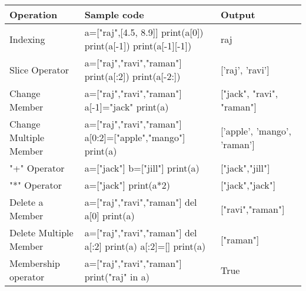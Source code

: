 
\begin{flushleft}
		
		\begin{tabulary}{1.0\textwidth}{|p{7em}|p{10em}|p{7em}|}
			\toprule
			\textbf{Operation} & \textbf{Sample code}  & \textbf{Output} \\
			\midrule
			Indexing & a=["raj",[4.5, 8.9]] \newline print(a[0]) \newline print(a[-1])  \newline print(a[-1][-1]) & raj \newline [4.5, 8.9]  \\
			\hline
			Slice Operator & a=["raj","ravi","raman"] \newline print(a[:2]) \newline print(a[-2:]) & ['raj', 'ravi']   \\
			\hline
			Change Member & a=["raj","ravi","raman"] \newline a[-1]="jack" \newline
			print(a) & ["jack", "ravi", "raman"]  \\
			\hline
			Change Multiple Member & a=["raj","ravi","raman"] \newline a[0:2]=["apple","mango"]  \newline print(a) & ['apple', 'mango', 'raman']  \\
			\hline
			"+" Operator & a=["jack"] \newline b=["jill"] \newline print(a) & ["jack","jill"] \\
			\hline
			"*" Operator & a=["jack"] \newline print(a*2) & ["jack","jack"] \\
			\hline
			Delete a Member & a=["raj","ravi","raman"] \newline del a[0] \newline print(a) & ["ravi","raman"] \\
			\hline
			Delete Multiple Member & a=["raj","ravi","raman"] \newline del a[:2] \newline
			print(a) \newline a[:2]=[] \newline print(a) & ["raman"] \newline ["raman"] \\
			\hline
			Membership operator & a=["raj","ravi","raman"] \newline 
			print("raj" in a) & True  \\
			\bottomrule
		\end{tabulary}

	
\end{flushleft}

